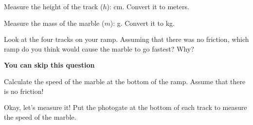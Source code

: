 \documentclass[10pt]{exam}
\begin{document}
\begin{questions}
  
\question \label{height}
  Measure the height of the track ($h$): 
   cm.  Convert it to meters.


\question \label{mass}
  Measure the mass of the marble ($m$): 
   g.  Convert it to kg.
  

\question \label{prediction}
  Look at the four tracks on your ramp.  Assuming that there was no friction, which ramp do you think would cause the marble to go fastest?  Why?

  \begin{solution}[10em]
    {\color{red} \bf You can skip this question}
  \end{solution}

\question \label{expected-first}
  Calculate the speed of the marble at the bottom of the ramp.  Assume that there is no friction!
  \vs

  
\pagebreak

\question \label{data}
  Okay, let's measure it!  Put the photogate at the bottom of each track to measure the speed of the marble.

  \newcommand{\datatable}[2]{
    \renewcommand{\arraystretch}{1.5}
    \begin{tabular}{|c|p{5em}|}
      \hline
      \centering\arraybackslash Track & 
      \centering\arraybackslash Measured Velocity (m/s) \\
      \hline
      \ifprintanswers
        \multirow[c]{5}{*}{#1} & xxxx \\ \cline{2-2}
        & xxxx \\ \cline{2-2}
        & xxxx \\ \cline{2-2}
        & xxxx \\ \cline{2-2}
        & xxxx \\ \hline\hline
        Avg. & \bf\color{red}  #2 \\ \hline
      \else
        \multirow[c]{5}{*}{#1} & \\ \cline{2-2}
        &\\ \cline{2-2}
        &\\ \cline{2-2}
        &\\ \cline{2-2}
        &\\ \hline\hline
        Avg. &  \\ \hline
      \fi
    \end{tabular}
    \renewcommand{\arraystretch}{1}
  }


\end{questions}
\end{document}
